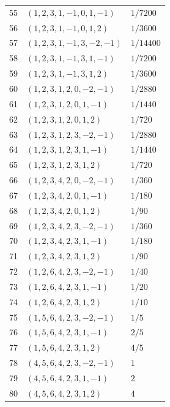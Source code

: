 \begin{longtable}{@{}rll@{}}
55 & $(1,2,3,1,-1,0,1,-1)$ & $1/7200$\\
56 & $(1,2,3,1,-1,0,1,2)$ & $1/3600$\\
57 & $(1,2,3,1,-1,3,-2,-1)$ & $1/14400$\\
58 & $(1,2,3,1,-1,3,1,-1)$ & $1/7200$\\
59 & $(1,2,3,1,-1,3,1,2)$ & $1/3600$\\
60 & $(1,2,3,1,2,0,-2,-1)$ & $1/2880$\\
61 & $(1,2,3,1,2,0,1,-1)$ & $1/1440$\\
62 & $(1,2,3,1,2,0,1,2)$ & $1/720$\\
63 & $(1,2,3,1,2,3,-2,-1)$ & $1/2880$\\
64 & $(1,2,3,1,2,3,1,-1)$ & $1/1440$\\
65 & $(1,2,3,1,2,3,1,2)$ & $1/720$\\
66 & $(1,2,3,4,2,0,-2,-1)$ & $1/360$\\
67 & $(1,2,3,4,2,0,1,-1)$ & $1/180$\\
68 & $(1,2,3,4,2,0,1,2)$ & $1/90$\\
69 & $(1,2,3,4,2,3,-2,-1)$ & $1/360$\\
70 & $(1,2,3,4,2,3,1,-1)$ & $1/180$\\
71 & $(1,2,3,4,2,3,1,2)$ & $1/90$\\
72 & $(1,2,6,4,2,3,-2,-1)$ & $1/40$\\
73 & $(1,2,6,4,2,3,1,-1)$ & $1/20$\\
74 & $(1,2,6,4,2,3,1,2)$ & $1/10$\\
75 & $(1,5,6,4,2,3,-2,-1)$ & $1/5$\\
76 & $(1,5,6,4,2,3,1,-1)$ & $2/5$\\
77 & $(1,5,6,4,2,3,1,2)$ & $4/5$\\
78 & $(4,5,6,4,2,3,-2,-1)$ & $1$\\
79 & $(4,5,6,4,2,3,1,-1)$ & $2$\\
80 & $(4,5,6,4,2,3,1,2)$ & $4$\\
\end{longtable}
\endgroup

